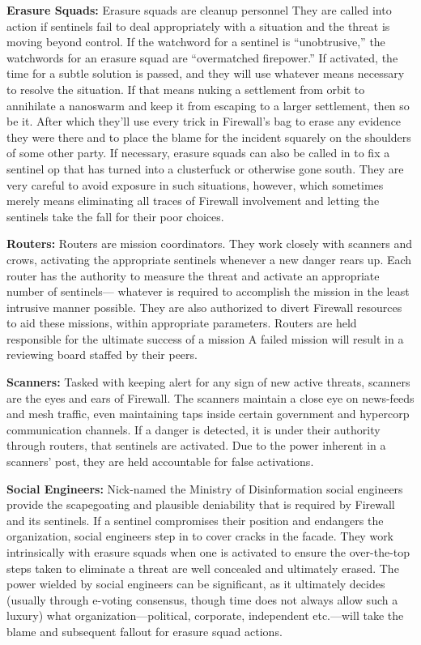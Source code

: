 \textbf{Erasure Squads:} Erasure squads are cleanup personnel
They are called into action if sentinels fail to
deal appropriately with a situation and the threat is 
moving beyond control. If the watchword for a sentinel
is ``unobtrusive,'' the watchwords for an erasure
squad are ``overmatched firepower.'' If activated, the 
time for a subtle solution is passed, and they will use 
whatever means necessary to resolve the situation. 
If that means nuking a settlement from orbit to annihilate
a nanoswarm and keep it from escaping to
a larger settlement, then so be it. After which they'll 
use every trick in Firewall's bag to erase any evidence 
they were there and to place the blame for the incident
squarely on the shoulders of some other party.
If necessary, erasure squads can also be called in to 
fix a sentinel op that has turned into a clusterfuck or 
otherwise gone south. They are very careful to avoid 
exposure in such situations, however, which sometimes
merely means eliminating all traces of Firewall
involvement and letting the sentinels take the fall for 
their poor choices.

\textbf{Routers:} Routers are mission coordinators. They 
work closely with scanners and crows, activating the 
appropriate sentinels whenever a new danger rears up. 
Each router has the authority to measure the threat 
and activate an appropriate number of sentinels—
whatever is required to accomplish the mission in 
the least intrusive manner possible. They are also 
authorized to divert Firewall resources to aid these 
missions, within appropriate parameters. Routers are 
held responsible for the ultimate success of a mission
A failed mission will result in a reviewing board
staffed by their peers. 

\textbf{Scanners:} Tasked with keeping alert for any sign of 
new active threats, scanners are the eyes and ears of 
Firewall. The scanners maintain a close eye on news-feeds
and mesh traffic, even maintaining taps inside
certain government and hypercorp communication 
channels. If a danger is detected, it is under their authority
through routers, that sentinels are activated.
Due to the power inherent in a scanners' post, they 
are held accountable for false activations.

\textbf{Social Engineers:} Nick-named the Ministry of Disinformation
social engineers provide the scapegoating
and plausible deniability that is required by Firewall 
and its sentinels. If a sentinel compromises their position
and endangers the organization, social engineers
step in to cover cracks in the facade. They work intrinsically
with erasure squads when one is activated
to ensure the over-the-top steps taken to eliminate a 
threat are well concealed and ultimately erased. The 
power wielded by social engineers can be significant, 
as it ultimately decides (usually through e-voting 
consensus, though time does not always allow such 
a luxury) what organization—political, corporate, independent
etc.—will take the blame and subsequent
fallout for erasure squad actions. 

